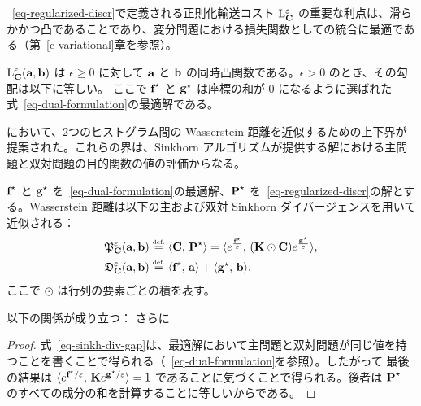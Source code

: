 ~\eqref{eq-regularized-discr}で定義される正則化輸送コスト $\MKD_\C^\varepsilon$ の重要な利点は、滑らかかつ凸であることであり、変分問題における損失関数としての統合に最適である（第~\ref{c-variational}章を参照）。

\begin{prop}\label{prop-convexity-dual}
$\MKD_\C^\varepsilon(\a,\b)$ は $\epsilon\geq 0$ に対して $\a$ と $\b$ の同時凸関数である。$\epsilon>0$ のとき、その勾配は以下に等しい。
\eq{
	\nabla\MKD_\C^\varepsilon(\a,\b)= \begin{bmatrix} \fD^\star \\ \gD^\star \end{bmatrix},
}
ここで $\fD^\star$ と $\gD^\star$ は座標の和が $0$ になるように選ばれた式~\eqref{eq-dual-formulation}の最適解である。
\end{prop}


\citep{CuturiSinkhorn}において、2つのヒストグラム間の Wasserstein 距離を近似するための上下界が提案された。これらの界は、Sinkhorn アルゴリズムが提供する解における主問題と双対問題の目的関数の値の評価からなる。

\begin{defn}
	$\fD^\star$ と $\gD^\star$ を~\eqref{eq-dual-formulation}の最適解、$\P^\star$ を~\eqref{eq-regularized-discr}の解とする。Wasserstein 距離は以下の主および双対 Sinkhorn ダイバージェンスを用いて近似される：
\begin{align*}
	\SINKHORNP_\C^\varepsilon(\a,\b)& \eqdef \dotp{\C}{\P^\star} =  \dotp{e^{\frac{\fD^\star}{\varepsilon}}}{(\K\odot \C)e^{\frac{\gD^\star}{\varepsilon}}}, \\
	\SINKHORND_\C^\varepsilon(\a,\b) & \eqdef \dotp{\fD^\star}{\a} + \dotp{\gD^\star}{\b},
\end{align*}
ここで $\odot$ は行列の要素ごとの積を表す。
\end{defn}

\begin{prop}\label{prop-sinkhorn-div}
以下の関係が成り立つ：
さらに
\end{prop}
\begin{proof}
式~\eqref{eq-sinkh-div-gap}は、最適解において主問題と双対問題が同じ値を持つことを書くことで得られる（~\eqref{eq-dual-formulation}を参照）。したがって
最後の結果は $\dotp{e^{\fD^\star/\varepsilon} }{ \K e^{\gD^\star/\varepsilon}}=1$ であることに気づくことで得られる。後者は $\P^\star$ のすべての成分の和を計算することに等しいからである。
\end{proof}


